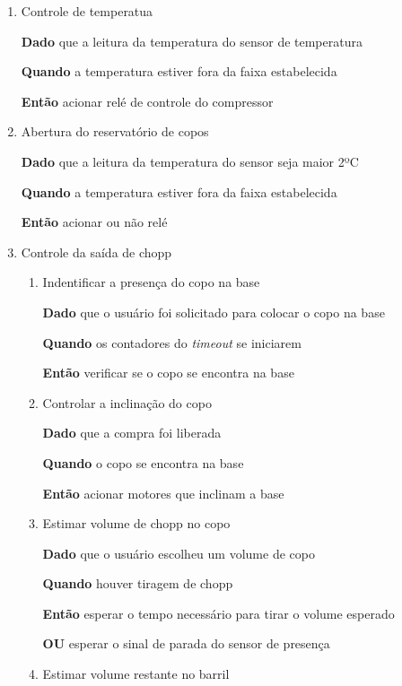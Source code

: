 \begin{enumerate}
\item Controle de temperatua

\textbf{Dado} que a leitura da temperatura do sensor de temperatura

\textbf{Quando} a temperatura estiver fora da faixa estabelecida

\textbf{Então} acionar  relé de controle do compressor


\item Abertura do reservatório de copos

\textbf{Dado} que a leitura da temperatura do sensor seja maior 2ºC

\textbf{Quando} a temperatura estiver fora da faixa estabelecida

\textbf{Então} acionar ou não relé



\item Controle da saída de chopp

\begin{enumerate}

\item Indentificar a presença do copo na base

\textbf{Dado} que o usuário foi solicitado para colocar o copo na base 

\textbf{Quando} os contadores do \textit{timeout} se iniciarem

\textbf{Então} verificar se o copo se encontra na base 



\item Controlar a inclinação do copo

\textbf{Dado} que a compra foi liberada

\textbf{Quando} o copo se encontra na base

\textbf{Então} acionar motores que inclinam a base


\item Estimar volume de chopp no copo

\textbf{Dado} que o usuário escolheu um volume de copo

\textbf{Quando} houver tiragem de chopp

\textbf{Então} esperar o tempo necessário para tirar o volume esperado

\textbf{OU} esperar o sinal de parada do sensor de presença



\item Estimar volume restante no barril


\end{enumerate}
\end{enumerate}
